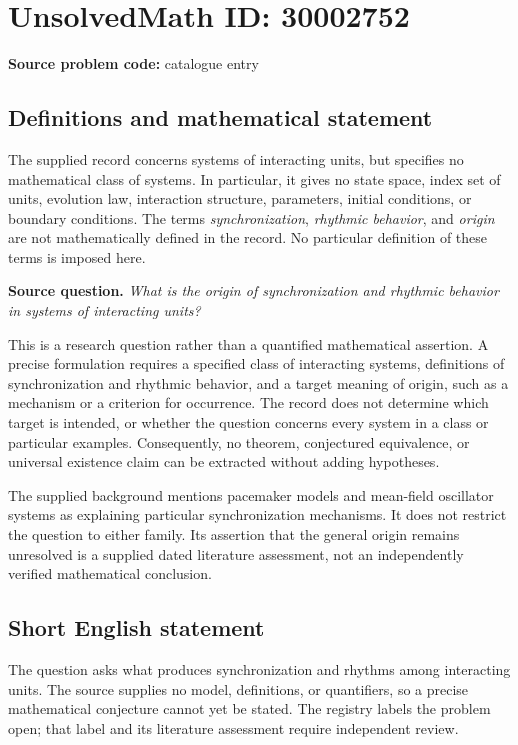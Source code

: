 \documentclass[11pt]{article}
\begin{document}
\section*{UnsolvedMath ID: 30002752}
\textbf{Source problem code:} catalogue entry
\subsection{Definitions and mathematical statement}
The supplied record concerns systems of interacting units, but specifies no mathematical class of systems. In particular, it gives no state space, index set of units, evolution law, interaction structure, parameters, initial conditions, or boundary conditions. The terms \emph{synchronization}, \emph{rhythmic behavior}, and \emph{origin} are not mathematically defined in the record. No particular definition of these terms is imposed here.

\textbf{Source question.} \emph{What is the origin of synchronization and rhythmic behavior in systems of interacting units?}

This is a research question rather than a quantified mathematical assertion. A precise formulation requires a specified class of interacting systems, definitions of synchronization and rhythmic behavior, and a target meaning of origin, such as a mechanism or a criterion for occurrence. The record does not determine which target is intended, or whether the question concerns every system in a class or particular examples. Consequently, no theorem, conjectured equivalence, or universal existence claim can be extracted without adding hypotheses.

The supplied background mentions pacemaker models and mean-field oscillator systems as explaining particular synchronization mechanisms. It does not restrict the question to either family. Its assertion that the general origin remains unresolved is a supplied dated literature assessment, not an independently verified mathematical conclusion.
\subsection{Short English statement}
The question asks what produces synchronization and rhythms among interacting units. The source supplies no model, definitions, or quantifiers, so a precise mathematical conjecture cannot yet be stated. The registry labels the problem open; that label and its literature assessment require independent review.
\end{document}
